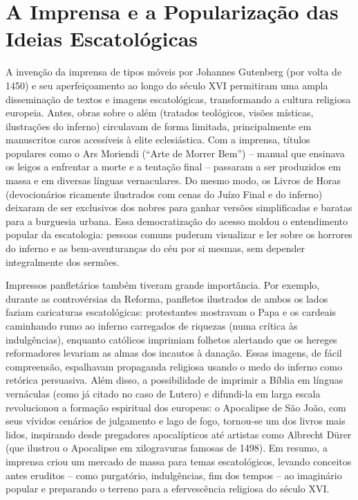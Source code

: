\section{A Imprensa e a Popularização das Ideias Escatológicas}

A invenção da imprensa de tipos móveis por Johannes Gutenberg (por volta de 1450) e seu aperfeiçoamento ao longo do século XVI permitiram uma ampla disseminação de textos e imagens escatológicas, transformando a cultura religiosa europeia. Antes, obras sobre o além (tratados teológicos, visões místicas, ilustrações do inferno) circulavam de forma limitada, principalmente em manuscritos caros acessíveis à elite eclesiástica. Com a imprensa, títulos populares como o Ars Moriendi (“Arte de Morrer Bem”) -- manual que ensinava os leigos a enfrentar a morte e a tentação final -- passaram a ser produzidos em massa e em diversas línguas vernaculares. Do mesmo modo, os Livros de Horas (devocionários ricamente ilustrados com cenas do Juízo Final e do inferno) deixaram de ser exclusivos dos nobres para ganhar versões simplificadas e baratas para a burguesia urbana. Essa democratização do acesso moldou o entendimento popular da escatologia: pessoas comuns puderam visualizar e ler sobre os horrores do inferno e as bem-aventuranças do céu por si mesmas, sem depender integralmente dos sermões.

Impressos panfletários também tiveram grande importância. Por exemplo, durante as controvérsias da Reforma, panfletos ilustrados de ambos os lados faziam caricaturas escatológicas: protestantes mostravam o Papa e os cardeais caminhando rumo ao inferno carregados de riquezas (numa crítica às indulgências), enquanto católicos imprimiam folhetos alertando que os hereges reformadores levariam as almas dos incautos à danação. Essas imagens, de fácil compreensão, espalhavam propaganda religiosa usando o medo do inferno como retórica persuasiva. Além disso, a possibilidade de imprimir a Bíblia em línguas vernáculas (como já citado no caso de Lutero) e difundi-la em larga escala revolucionou a formação espiritual dos europeus: o Apocalipse de São João, com seus vívidos cenários de julgamento e lago de fogo, tornou-se um dos livros mais lidos, inspirando desde pregadores apocalípticos até artistas como Albrecht Dürer (que ilustrou o Apocalipse em xilogravuras famosas de 1498). Em resumo, a imprensa criou um mercado de massa para temas escatológicos, levando conceitos antes eruditos -- como purgatório, indulgências, fim dos tempos -- ao imaginário popular e preparando o terreno para a efervescência religiosa do século XVI.

